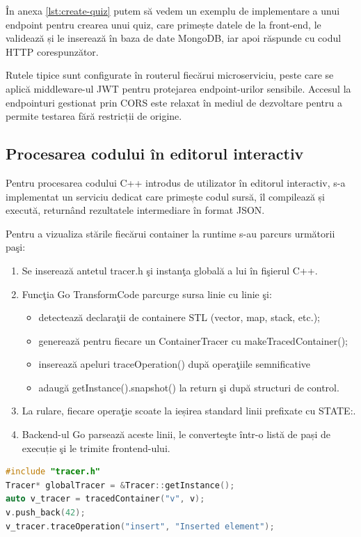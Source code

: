 În anexa \ref{lst:create-quiz} putem să vedem un exemplu de implementare a unui endpoint pentru crearea unui quiz,
care primește datele de la front-end, le validează și le inserează în baza de date MongoDB, iar apoi răspunde 
cu codul HTTP corespunzător.

Rutele tipice sunt configurate în routerul fiecărui microserviciu,
peste care se aplică middleware-ul JWT pentru protejarea endpoint-urilor sensibile.
Accesul la endpointuri gestionat prin CORS este relaxat în mediul de dezvoltare
pentru a permite testarea fără restricții de origine.

\subsection{Procesarea codului în editorul interactiv}
\label{subsec:procesare-cod}
Pentru procesarea codului C++ introdus de utilizator în editorul interactiv,
s-a implementat un serviciu dedicat care primește codul sursă, îl compilează și execută,
returnând rezultatele intermediare în format JSON.

Pentru a vizualiza stările fiecărui container la runtime s-au parcurs următorii paşi:
\begin{enumerate}
  \item Se inserează antetul tracer.h şi instanţa globală a lui în fişierul C++.
  \item Funcţia Go TransformCode parcurge sursa linie cu linie şi:
        \begin{itemize}
          \item detectează declaraţii de containere STL (vector, map, stack, etc.);
          \item generează pentru fiecare un ContainerTracer cu makeTracedContainer();
          \item inserează apeluri traceOperation() după operaţiile semnificative
          \item adaugă getInstance().snapshot() la return şi după structuri de control.
        \end{itemize}
  \item La rulare, fiecare operaţie scoate la ieșirea standard linii prefixate cu STATE:.
  \item Backend-ul Go parsează aceste linii, le converteşte într-o listă de pași de execuție şi le trimite frontend-ului.
\end{enumerate}


\begin{lstlisting}[language=C++, caption={Injectarea antetului și singleton-ului tracer}, label={lst:inject-header}]
#include "tracer.h"
Tracer* globalTracer = &Tracer::getInstance();
auto v_tracer = tracedContainer("v", v);
v.push_back(42);
v_tracer.traceOperation("insert", "Inserted element");
\end{lstlisting}

